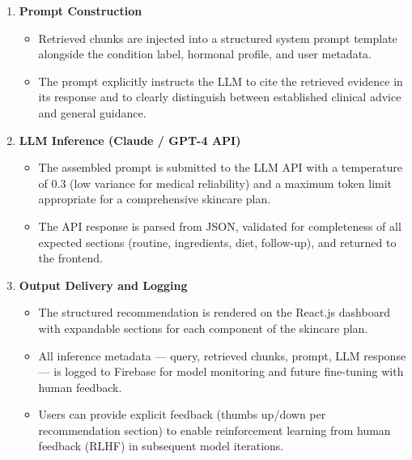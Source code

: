\begin{enumerate}
    \item \textbf{Prompt Construction}
    \begin{itemize}
        \item Retrieved chunks are injected into a structured system prompt template alongside the condition label, hormonal profile, and user metadata.
        \item The prompt explicitly instructs the LLM to cite the retrieved evidence in its response and to clearly distinguish between established clinical advice and general guidance.
    \end{itemize}
    \vspace{0.3cm}

    \item \textbf{LLM Inference (Claude / GPT-4 API)}
    \begin{itemize}
        \item The assembled prompt is submitted to the LLM API with a temperature of 0.3 (low variance for medical reliability) and a maximum token limit appropriate for a comprehensive skincare plan.
        \item The API response is parsed from JSON, validated for completeness of all expected sections (routine, ingredients, diet, follow-up), and returned to the frontend.
    \end{itemize}
    \vspace{0.3cm}

    \item \textbf{Output Delivery and Logging}
    \begin{itemize}
        \item The structured recommendation is rendered on the React.js dashboard with expandable sections for each component of the skincare plan.
        \item All inference metadata — query, retrieved chunks, prompt, LLM response — is logged to Firebase for model monitoring and future fine-tuning with human feedback.
        \item Users can provide explicit feedback (thumbs up/down per recommendation section) to enable reinforcement learning from human feedback (RLHF) in subsequent model iterations.
    \end{itemize}
\end{enumerate}
